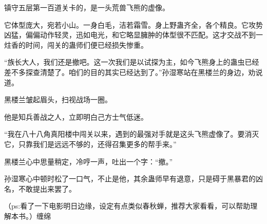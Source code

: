 \begin{this_body}
镇守五层第一百道关卡的，是一头荒兽飞熊的虚像。

它体型庞大，宛若小山。一身白毛，洁若霜雪。身上野蛊齐全，各个精良。它攻势凶猛，偏偏动作轻灵，迅如电光，和它略显臃肿的体型很不匹配。这才交战不到一炷香的时间，闯关的蛊师们便已经损失惨重。

“族长大人，我们还是撤吧。这一次我们是以试探为主，如今飞熊身上的蛊虫已经差不多探查清楚了。咱们的目的其实已经达到了。”孙湿寒站在黑楼兰的身边，劝说道。

黑楼兰皱起眉头，扫视战场一圈。

他是知兵善战之人，立即明白己方士气低迷。

“我在八十八角真阳楼中闯关以来，遇到的最强对手就是这头飞熊虚像了。要消灭它，只靠我们是远远不够的，还得召集更多的帮手来。”

黑楼兰心中思量稍定，冷哼一声，吐出一个字：“撤。”

孙湿寒心中顿时松了一口气，不止是他，其余蛊师早有退意，只是碍于黑暴君的凶名，不敢提出来罢了。

（ps:看了一下电影明日边缘，设定有点类似春秋蝉，推荐大家看看，可以帮助理解本书。）缠绵

\end{this_body}

